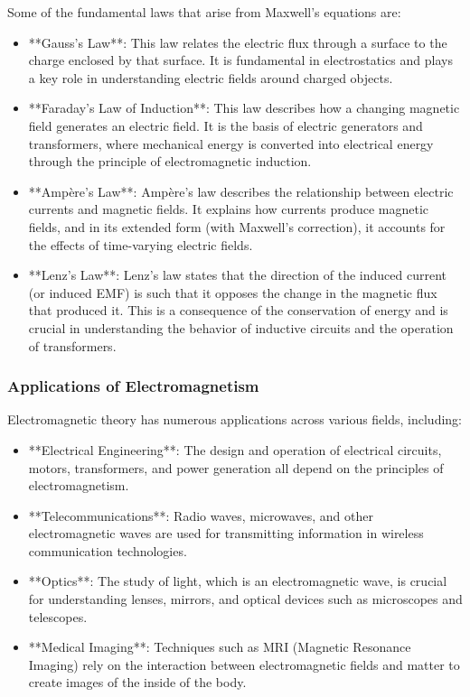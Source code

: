 \documentclass{article}
\begin{document}
Some of the fundamental laws that arise from Maxwell's equations are:

\begin{itemize}
    \item **Gauss's Law**: This law relates the electric flux through a surface to the charge enclosed by that surface. It is fundamental in electrostatics and plays a key role in understanding electric fields around charged objects.
    
    \item **Faraday's Law of Induction**: This law describes how a changing magnetic field generates an electric field. It is the basis of electric generators and transformers, where mechanical energy is converted into electrical energy through the principle of electromagnetic induction.

    \item **Ampère’s Law**: Ampère's law describes the relationship between electric currents and magnetic fields. It explains how currents produce magnetic fields, and in its extended form (with Maxwell’s correction), it accounts for the effects of time-varying electric fields.
    
    \item **Lenz’s Law**: Lenz’s law states that the direction of the induced current (or induced EMF) is such that it opposes the change in the magnetic flux that produced it. This is a consequence of the conservation of energy and is crucial in understanding the behavior of inductive circuits and the operation of transformers.

\end{itemize}

\subsubsection*{Applications of Electromagnetism}

Electromagnetic theory has numerous applications across various fields, including:

\begin{itemize}
    \item **Electrical Engineering**: The design and operation of electrical circuits, motors, transformers, and power generation all depend on the principles of electromagnetism.
    \item **Telecommunications**: Radio waves, microwaves, and other electromagnetic waves are used for transmitting information in wireless communication technologies.
    \item **Optics**: The study of light, which is an electromagnetic wave, is crucial for understanding lenses, mirrors, and optical devices such as microscopes and telescopes.
    \item **Medical Imaging**: Techniques such as MRI (Magnetic Resonance Imaging) rely on the interaction between electromagnetic fields and matter to create images of the inside of the body.
\end{itemize}
\end{document}

